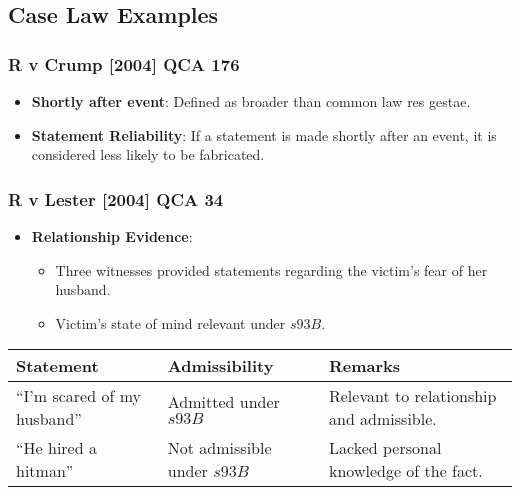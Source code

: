\subsection{   Case Law Examples}\label{case-law-examples}

\subsubsection{R v Crump {[}2004{]} QCA
176}\label{r-v-crump-2004-qca-176}

\begin{itemize}
\tightlist
\item
  \textbf{Shortly after event}: Defined as broader than common law res
  gestae.
\item
  \textbf{Statement Reliability}: If a statement is made shortly after
  an event, it is considered less likely to be fabricated.
\end{itemize}

\subsubsection{R v Lester {[}2004{]} QCA
34}\label{r-v-lester-2004-qca-34}

\begin{itemize}
\tightlist
\item
  \textbf{Relationship Evidence}:

  \begin{itemize}
  \tightlist
  \item
    Three witnesses provided statements regarding the victim's fear of
    her husband.
  \item
    Victim's state of mind relevant under \(s93B\).
  \end{itemize}
\end{itemize}

\begin{longtable}[]{@{}
  >{\raggedright\arraybackslash}p{}
  >{\raggedright\arraybackslash}p{}
  >{\raggedright\arraybackslash}p{}@{}}
\toprule\noalign{}
\begin{minipage}[b]{\linewidth}\raggedright
Statement
\end{minipage} & \begin{minipage}[b]{\linewidth}\raggedright
Admissibility
\end{minipage} & \begin{minipage}[b]{\linewidth}\raggedright
Remarks
\end{minipage} \\
\midrule\noalign{}
\endhead
\bottomrule\noalign{}
\endlastfoot
``I'm scared of my husband'' & Admitted under \(s93B\) & Relevant to
relationship and admissible. \\
``He hired a hitman'' & Not admissible under \(s93B\) & Lacked personal
knowledge of the fact. \\
\end{longtable}

